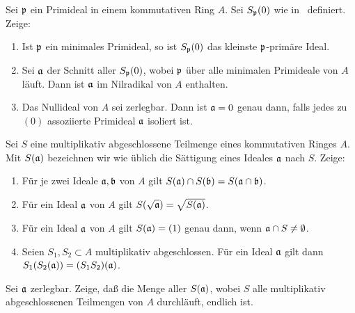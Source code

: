 \begin{exercise}
	\label{exer:everywhere_zero_germ}
	Sei \(\mathfrak{p}\) ein Primideal in einem kommutativen Ring \(A\).
	Sei \(S_{\mathfrak{p}}(0)\) wie in~ definiert. Zeige:
	\begin{enumerate}
	\item
		Ist \(\mathfrak{p}\) ein minimales Primideal, so ist
		\(S_{\mathfrak{p}}(0)\) das kleinste \(\mathfrak{p}\)-primäre Ideal.
	\item
		Sei \(\mathfrak{a}\) der Schnitt aller \(S_{\mathfrak{p}}(0)\), wobei
		\(\mathfrak{p}\) über alle minimalen Primideale von \(A\) läuft. Dann
		ist \(\mathfrak{a}\) im Nilradikal von \(A\) enthalten.
	\item
		Das Nullideal von \(A\) sei zerlegbar. Dann ist \(\mathfrak{a} = 0\) genau
		dann, falls jedes zu \((0)\) assoziierte Primideal \(\mathfrak{a}\) isoliert
		ist.
	\end{enumerate}
\end{exercise}

\begin{exercise}
	\label{exer:saturation}
	Sei \(S\) eine multiplikativ abgeschlossene Teilmenge eines kommutativen
	Ringes \(A\). Mit \(S(\mathfrak{a})\) bezeichnen wir wie üblich die Sättigung
	eines Ideales \(\mathfrak{a}\) nach \(S\).
	Zeige:
	\begin{enumerate}
	\item
		Für je zwei Ideale \(\mathfrak{a}, \mathfrak{b}\) von \(A\) gilt
		\(S(\mathfrak{a}) \cap S(\mathfrak{b}) = S(\mathfrak{a} \cap \mathfrak{b})\).
	\item
		Für ein Ideal \(\mathfrak{a}\) von \(A\) gilt \(S(\sqrt{\mathfrak{a}})
		= \sqrt{S(\mathfrak{a})}\).
	\item
		Für ein Ideal \(\mathfrak{a}\) von \(A\) gilt \(S(\mathfrak{a}) = (1)\) genau
		dann, wenn \(\mathfrak{a} \cap S \neq \emptyset\).
	\item
		Seien \(S_1, S_2 \subset A\) multiplikativ abgeschlossen. Für ein
		Ideal \(\mathfrak{a}\) gilt dann \(S_1(S_2(\mathfrak{a}))
		= (S_1 S_2)(\mathfrak{a})\).
	\end{enumerate}
	
	Sei \(\mathfrak{a}\) zerlegbar. Zeige, daß die Menge aller \(S(\mathfrak{a})\),
	wobei \(S\) alle multiplikativ abgeschlossenen Teilmengen von \(A\)
	durchläuft, endlich ist.
\end{exercise}


